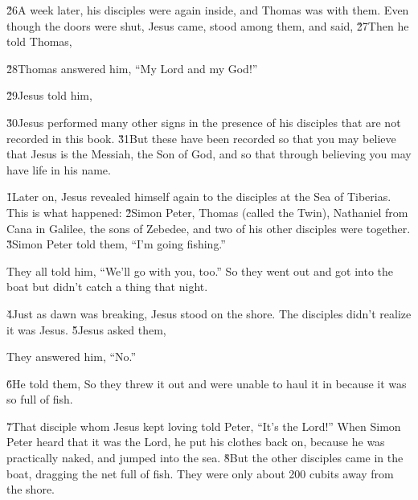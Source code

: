 \v{26}A week later, his disciples were again inside, and Thomas was with them. Even though the doors were shut, Jesus came, stood among them, and said,  \v{27}Then he told Thomas, 

\v{28}Thomas answered him, ``My Lord and my God!''

\v{29}Jesus told him, 

\v{30}Jesus performed many other signs in the presence of his disciples that are not recorded in this book. \v{31}But these have been recorded so that you may believe that Jesus is the Messiah, the Son of God, and so that through believing you may have life in his name.

\v{1}Later on, Jesus revealed himself again to the disciples at the Sea of Tiberias. This is what happened: \v{2}Simon Peter, Thomas (called the Twin), Nathaniel from Cana in Galilee, the sons of Zebedee, and two of his other disciples were together. \v{3}Simon Peter told them, ``I'm going fishing.''

They all told him, ``We'll go with you, too.'' So they went out and got into the boat but didn't catch a thing that night.

\v{4}Just as dawn was breaking, Jesus stood on the shore. The disciples didn't realize it was Jesus. \v{5}Jesus asked them, 

They answered him, ``No.''

\v{6}He told them,  So they threw it out and were unable to haul it in because it was so full of fish.

\v{7}That disciple whom Jesus kept loving told Peter, ``It's the Lord!'' When Simon Peter heard that it was the Lord, he put his clothes back on, because he was practically naked, and jumped into the sea. \v{8}But the other disciples came in the boat, dragging the net full of fish. They were only about 200 cubits away from the shore.

